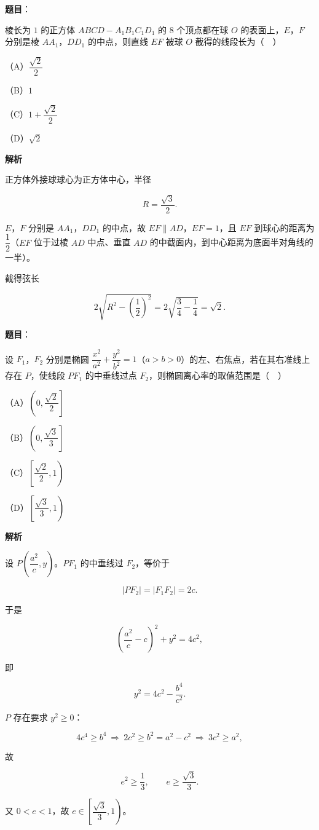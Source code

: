 \begin{answer}

\textbf{题目}：

棱长为 $1$ 的正方体 $ABCD-A_1B_1C_1D_1$ 的 $8$ 个顶点都在球 $O$ 的表面上，$E$，$F$ 分别是棱 $AA_1$，$DD_1$ 的中点，则直线 $EF$ 被球 $O$ 截得的线段长为（　）

（A）$\dfrac{\sqrt2}2$

（B）$1$

（C）$1+\dfrac{\sqrt2}2$

（D）$\sqrt2$

\textbf{解析}

正方体外接球球心为正方体中心，半径

\nopagebreak[4]
\[R=\frac{\sqrt3}2.\]

$E$，$F$ 分别是 $AA_1$，$DD_1$ 的中点，故 $EF\parallel AD$，$EF=1$，且 $EF$ 到球心的距离为 $\dfrac12$（$EF$ 位于过棱 $AD$ 中点、垂直 $AD$ 的中截面内，到中心距离为底面半对角线的一半）。

截得弦长

\nopagebreak[4]
\[2\sqrt{R^2-\left(\frac12\right)^2}=2\sqrt{\frac34-\frac14}=\sqrt2.\]


\end{answer}
\begin{answer}

\textbf{题目}：

设 $F_1$，$F_2$ 分别是椭圆 $\dfrac{x^2}{a^2}+\dfrac{y^2}{b^2}=1$（$a>b>0$）的左、右焦点，若在其右准线上存在 $P$，使线段 $PF_1$ 的中垂线过点 $F_2$，则椭圆离心率的取值范围是（　）

（A）$\left(0,\dfrac{\sqrt2}2\right]$

（B）$\left(0,\dfrac{\sqrt3}3\right]$

（C）$\left[\dfrac{\sqrt2}2,1\right)$

（D）$\left[\dfrac{\sqrt3}3,1\right)$

\textbf{解析}

设 $P\left(\dfrac{a^2}c,y\right)$。$PF_1$ 的中垂线过 $F_2$，等价于

\nopagebreak[4]
\[|PF_2|=|F_1F_2|=2c.\]

于是

\nopagebreak[4]
\[\left(\frac{a^2}c-c\right)^2+y^2=4c^2,\]

即

\nopagebreak[4]
\[y^2=4c^2-\frac{b^4}{c^2}.\]

$P$ 存在要求 $y^2\geqslant0$：

\nopagebreak[4]
\[4c^4\geqslant b^4\ \Longrightarrow\ 2c^2\geqslant b^2=a^2-c^2\ \Longrightarrow\ 3c^2\geqslant a^2,\]

故

\nopagebreak[4]
\[e^2\geqslant\frac13,\qquad e\geqslant\frac{\sqrt3}3.\]

又 $0<e<1$，故 $e\in\left[\dfrac{\sqrt3}3,1\right)$。


\end{answer}

